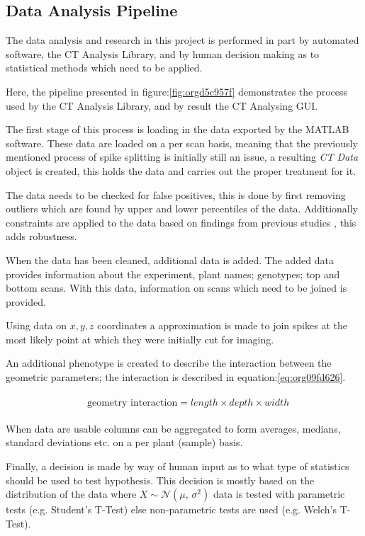 \documentclass[11pt]{report}
\begin{document}
\subsection{Data Analysis Pipeline}
\label{sec:org8c2b7fe}
The data analysis and research in this project is performed in part by automated software, the CT Analysis Library, and by human decision making as to statistical methods which need to be applied.

Here, the pipeline presented in figure:\ref{fig:orgd5c957f} demonstrates the process used by the CT Analysis Library, and by result the CT Analysing GUI.

The first stage of this process is loading in the data exported by the MATLAB software. These data are loaded on a per scan basis, meaning that the previously mentioned process of spike splitting is initially still an issue, a resulting \emph{CT Data} object is created, this holds the data and carries out the proper treatment for it.

The data needs to be checked for false positives, this is done by first removing outliers which are found by upper and lower percentiles of the data. Additionally constraints are applied to the data based on findings from previous studies \cite{Hughes2017}, this adds robustness.

When the data has been cleaned, additional data is added. The added data provides information about the experiment, plant names; genotypes; top and bottom scans. With this data, information on scans which need to be joined is provided.

Using data on \(x,y,z\) coordinates a approximation is made to join spikes at the most likely point at which they were initially cut for imaging.

An additional phenotype is created to describe the interaction between the geometric parameters; the interaction is described in equation:\ref{eq:org09fd626}.

 \begin{align}
\label{eq:org09fd626}
   &\begin{aligned}
\text{geometry interaction} = length \times depth \times width
   \end{aligned}
 \end{align}

When data are usable columns can be aggregated to form averages, medians, standard deviations etc. on a per plant (sample) basis.

Finally, a decision is made by way of human input as to what type of statistics should be used to test hypothesis. This decision is mostly based on the distribution of the data where \(X \sim \mathcal{N}(\mu,\,\sigma^{2})\) data is tested with parametric tests (e.g. Student's T-Test) else non-parametric tests are used (e.g. Welch's T-Test).
\end{document}
